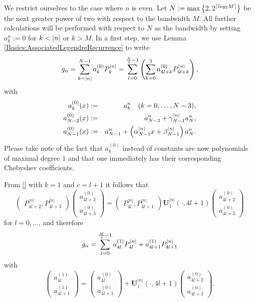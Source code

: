 We restrict ourselves to the case where $n$ is even. Let $N := \max \left\{2,2^{\left\lceil log_2 M\right\rceil}\right\rbrace$ be the next greater 
power of two with respect to the bandwidth $M$. All further calculations will be performed with respect to $N$ as the 
bandwidth by setting $a_k^n := 0$ for $k < \left\vert n\right\vert$ or $k > M$. In a first step, we use Lemma 
\ref{Basics:AssociatedLegendreRecurrence} to write
$$ g_n = \sum_{k = \left\vert n\right\vert}^{N-1} a_{k}^{(0)} P_k^{\left\vert n\right\vert} = \sum_{l = 0}^{\frac{N}{4}-1} \left(\sum_{k = 0}^3 a_{4l+k}^{(0)}P_{4l+k}^{\left\vert n\right\vert}\right),$$
with
\begin{eqnarray*}
  a_k^{(0)}{\hspace{-0.4ex}}\left(x\right)        & := & a_k^n \quad (k = 0,\ldots,N-3),\\
  a_{N-2}^{(0)}{\hspace{-0.4ex}}\left(x\right) & := & a_{N-2}^n + \gamma_{N-1}^{\left\vert n\right\vert} a_N^n,\\
  a_{N-1}^{(0)}{\hspace{-0.4ex}}\left(x\right) & := & a_{N-1}^n + \left(\alpha_{N-1}^{\left\vert n\right\vert}x + \beta_{N-1}^{\left\vert n\right\vert}\right) a_N^n.
\end{eqnarray*}
Please take note of the fact that $a_k^{(0)}$  instead of constants are now polynomials of 
maximal degree $1$ and that one immediately has their corresponding Chebyshev coefficients.

From \eqref{} with $k = 1$ and $c = l+1$ it follows that
$$
\left(\begin{array}{c}
  P_{4l+2}^{|n|}, 
  P_{4l+3}^{|n|}
\end{array}\right)
\left(\begin{array}{c}
  a_{4l+2}^{(0)}\\
  a_{4l+3}^{(0)} 
\end{array}\right)
=
\left(\begin{array}{c}
  P_{4l}^{|n|},
  P_{4l+1}^{|n|}
\end{array}\right)
{\mathbf{U}_{1}^{|n|}\left(\cdot,4l+1\right)}
\left(\begin{array}{c}
  a_{4l+2}^{(0)}\\
  a_{4l+3}^{(0)} 
\end{array}\right)
$$
for $l=0,\ldots,\frac{}{}$and therefore
$$ g_n = \sum_{l = 0}^{\frac{M}{4}-1} a_{4l}^{(1)} P_{4l}^{\left\vert n\right\vert} + a_{4l+1}^{(1)} P_{4l+1}^{\left\vert n\right\vert} $$
with
$$
\left(\begin{array}{c}
  a_{4l}^{(1)}\\
  a_{4l+1}^{(1)} 
\end{array}\right)
=
\left(\begin{array}{c}
  a_{4l}^{(0)}\\
  a_{4l+1}^{(0)} 
\end{array}\right)
+ {\mathbf{U}_{1}^{|n|}\left(\cdot,4l+1\right)}
\left(\begin{array}{c}
  a_{4l+2}^{(0)}\\
  a_{4l+3}^{(0)} 
\end{array}\right).
$$

